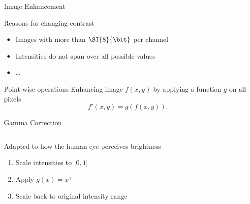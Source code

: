 \begin{frame}
\begin{center}
    \end{center}
\end{frame}

\begin{frame}{Image Enhancement}
\begin{block}{Reasons for changing contrast}
\begin{itemize}
\item Images with more than $\SI{8}{\bit}$ per channel
\item Intensities do not span over all possible values
\item \ldots
\end{itemize}
\end{block}
\begin{block}{Point-wise operations}
Enhancing image $f(x,y)$ by applying a function $g$ on all pixels
\begin{equation*}
f'(x,y) = g(f(x,y)).
\end{equation*}
\end{block}
\end{frame}

\begin{frame}{Gamma Correction}
\begin{columns}[T, onlytextwidth]
\begin{column}{0.4\textwidth}
Adapted to how the human eye perceives brightness
\bigskip

\begin{enumerate}
\item Scale intensities to $\lbrack0,1\rbrack$
\item Apply $g(x) = x^\gamma$
\item Scale back to original intensity range
\end{enumerate}
\end{column}
\begin{column}{0.6\textwidth}
\end{column}
\end{columns}
\end{frame}


